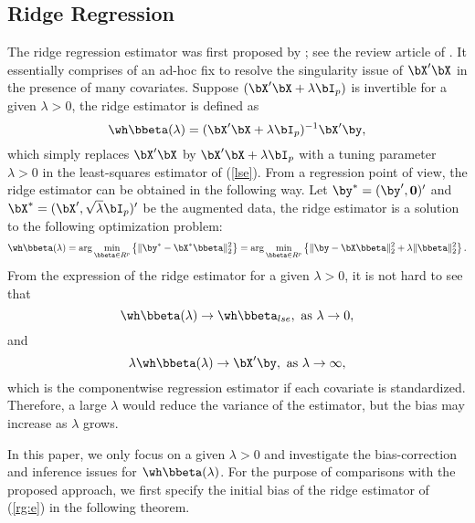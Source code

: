 \subsection{Ridge Regression}
The ridge regression estimator was first proposed by \cite{hoerl1959optimum}; see the review article of \cite{hoerl1985ridge}. It essentially comprises of an ad-hoc fix to resolve the singularity issue of $\bX'\bX$ in the presence of many covariates. Suppose $(\bX'\bX+\lambda\bI_p)$ is invertible for a given $\lambda>0$, the ridge estimator is defined as
\begin{equation}\label{rg:e}
    \wh\bbeta(\lambda)=(\bX'\bX+\lambda\bI_p)^{-1}\bX'\by,
\end{equation}
which simply replaces $\bX'\bX$ by $\bX'\bX+\lambda\bI_p$ with a tuning parameter $\lambda>0$ in the least-squares estimator of (\ref{lse}).  From a regression point of view, the ridge estimator can be obtained in the following way. Let $\by^*=(\by',{\bf 0})'$ and $\bX^*=(\bX',\sqrt{\lambda}\bI_p)'$ be the augmented data, the ridge estimator is a solution to the following optimization problem:
\begin{equation}
    \wh\bbeta(\lambda)=\arg\min_{\bbeta\in R^p}\left\{\|\by^*-\bX^*\bbeta\|_2^2\right\}=\arg\min_{\bbeta\in R^p}\left\{\|\by-\bX\bbeta\|_2^2+\lambda\|\bbeta\|_2^2\right\}.
\end{equation}
From the expression of the ridge estimator for a given $\lambda>0$,
it is not hard to see that
\[\wh\bbeta(\lambda)\rightarrow\wh\bbeta_{lse},\,\, \text{as}\,\, \lambda\rightarrow 0,\]
 and 
\[\lambda\wh\bbeta(\lambda)\rightarrow\bX'\by,\,\,\text{as}\,\, \lambda\rightarrow \infty,\]
which is the componentwise regression estimator if each covariate is standardized. Therefore, a large $\lambda$ would reduce the variance of the estimator, but the bias may increase as $\lambda$ grows. 

In this paper, we only focus on a given $\lambda>0$ and investigate the bias-correction and inference issues for $\wh\bbeta(\lambda)$. For the purpose of comparisons with the proposed approach, we first specify the initial bias of the ridge estimator of (\ref{rg:e}) in the following theorem.

